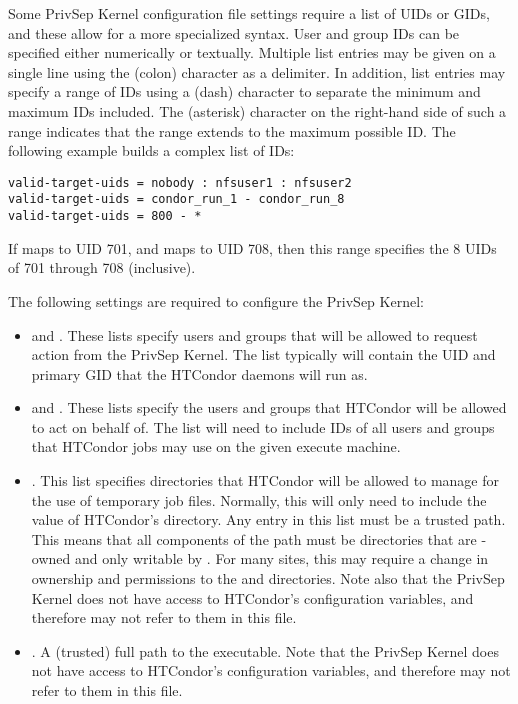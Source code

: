 Some PrivSep Kernel configuration file settings require a list of UIDs or GIDs,
and these allow for a more specialized syntax.
User and group IDs can be specified either numerically or textually.
Multiple list entries may be given on a single
line using the \Code{:} (colon) character as a delimiter.
In addition, list entries
may specify a range of IDs using a \Code{-} (dash)
character to separate the minimum and maximum IDs included.
The \Code{*} (asterisk) character on the right-hand side of such a
range indicates that the range extends to the maximum possible ID. 
The following example builds a complex list of IDs:
\begin{verbatim}
valid-target-uids = nobody : nfsuser1 : nfsuser2
valid-target-uids = condor_run_1 - condor_run_8
valid-target-uids = 800 - *
\end{verbatim}

If  maps to UID 701, and
 maps to UID 708, 
then this range specifies the 8 UIDs of 701 through 708 (inclusive).

The following settings are required to configure the PrivSep Kernel:
\begin{itemize}

\item {} and . These lists
specify users and groups that will be allowed to request action from
the PrivSep Kernel. The list typically will contain the
UID and primary GID that the HTCondor daemons will run as.

\item {} and . These lists
specify the users and groups that HTCondor will be allowed to act on
behalf of. The list will need to include IDs of all users and groups
that HTCondor jobs may use on the given execute machine.

\item {}. This list specifies directories that
HTCondor will be allowed to manage for the use of temporary job
files. Normally, this will only need to include the value of HTCondor's
 directory. Any entry in this list must be a trusted
path. This means that all components of the path must be directories
that are -owned and only writable by . For
many sites, this may require a change in ownership and permissions
to the  and  directories. Note also
that the PrivSep Kernel does not have access to HTCondor's configuration
variables, and therefore may not refer to them in this file.

\item {}. A (trusted) full path to the
 executable.
Note that the PrivSep Kernel does not
have access to HTCondor's configuration variables,
and therefore may not refer to them in this file.

\end{itemize}

